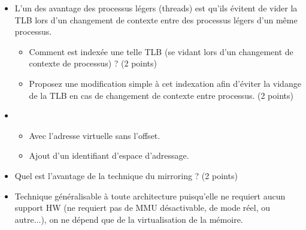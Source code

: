 \begin{itemize}
  \item L'un des avantage des processus l\'egers (threads) est qu'ils \'evitent de vider la TLB lors d'un changement de contexte entre des processus l\'egers d'un même processus.
  \begin{itemize}
    \item Comment est index\'ee une telle TLB (se vidant lors d'un changement de contexte de processus) ? (2 points)
    \item Proposez une modification simple \`a cet indexation afin d'\'eviter la vidange de la TLB en cas de changement de contexte entre processus. (2 points)
  \end{itemize}
\end{itemize}
             
\begin{correction}

\begin{itemize}
\item
  \begin{itemize}
    \item Avec l'adresse virtuelle sans l'offset.
    \item Ajout d'un identifiant d'espace d'adressage.
  \end{itemize}
\end{itemize}

\end{correction}
                                                                                                    \begin{itemize}
  \item Quel est l'avantage de la technique du mirroring ? (2 points)
\end{itemize}

\begin{correction}

\begin{itemize}
  \item Technique g\'en\'eralisable \`a toute architecture puisqu'elle ne requiert aucun support HW (ne requiert pas de MMU d\'esactivable, de mode r\'eel, ou autre...), on ne d\'epend que de la virtualisation de la m\'emoire.
\end{itemize}

\end{correction}

